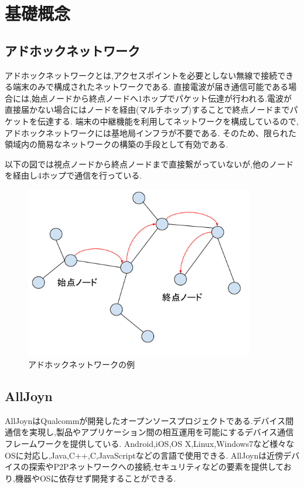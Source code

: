 \chapter{基礎概念}
\label{chap:concept}

\section{アドホックネットワーク}
アドホックネットワークとは,アクセスポイントを必要としない無線で接続できる端末のみで構成されたネットワークである.
直接電波が届き通信可能である場合には,始点ノードから終点ノードへ1ホップでパケット伝達が行われる.電波が直接届かない場合にはノードを経由(マルチホップ)することで終点ノードまでパケットを伝達する.
端末の中継機能を利用してネットワークを構成しているので,アドホックネットワークには基地局インフラが不要である.
そのため、限られた領域内の簡易なネットワークの構築の手段として有効である.

以下の図では視点ノードから終点ノードまで直接繋がっていないが,他のノードを経由し4ホップで通信を行っている.

\begin{figure}[htbp]
\centering
\includegraphics[width=10cm]{fig/ad-hoc.pdf}
\caption{アドホックネットワークの例}
\end{figure}

\section{AllJoyn}
AllJoynはQualcommが開発したオープンソースプロジェクトである.デバイス間通信を実現し,製品やアプリケーション間の相互運用を可能にするデバイス通信フレームワークを提供している.
Android,iOS,OS X,Linux,Windows7など様々なOSに対応し,Java,C++,C,JavaScriptなどの言語で使用できる.
AllJoynは近傍デバイスの探索やP2Pネットワークへの接続,セキュリティなどの要素を提供しており,機器やOSに依存せず開発することができる.



